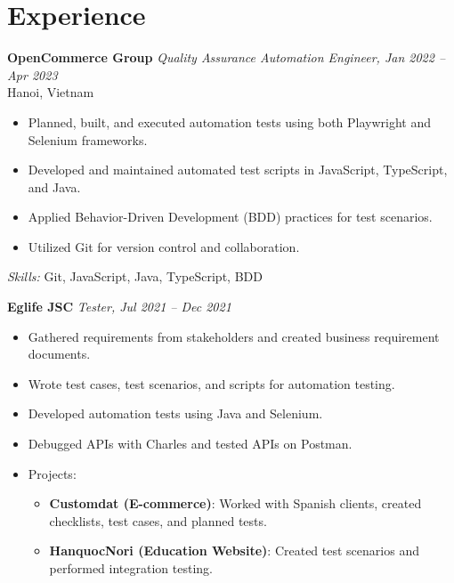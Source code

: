 \documentclass[11pt,a4paper]{article}
\begin{document}
    \section*{Experience}

    \textbf{OpenCommerce Group} \hfill \textit{Quality Assurance Automation Engineer, Jan 2022 -- Apr 2023} \\
    Hanoi, Vietnam
    \begin{itemize}[leftmargin=1.5em]
        \item Planned, built, and executed automation tests using both Playwright and Selenium frameworks.
        \item Developed and maintained automated test scripts in JavaScript, TypeScript, and Java.
        \item Applied Behavior-Driven Development (BDD) practices for test scenarios.
        \item Utilized Git for version control and collaboration.
    \end{itemize}
    \textit{Skills:} Git, JavaScript, Java, TypeScript, BDD

    \vspace{1.5em}

    \textbf{Eglife JSC} \hfill \textit{Tester, Jul 2021 -- Dec 2021}
    \begin{itemize}[leftmargin=1.5em]
        \item Gathered requirements from stakeholders and created business requirement documents.
        \item Wrote test cases, test scenarios, and scripts for automation testing.
        \item Developed automation tests using Java and Selenium.
        \item Debugged APIs with Charles and tested APIs on Postman.
        \item Projects:
        \begin{itemize}
            \item \textbf{Customdat (E-commerce)}: Worked with Spanish clients, created checklists, test cases, and planned tests.
            \item \textbf{HanquocNori (Education Website)}: Created test scenarios and performed integration testing.
        \end{itemize}
    \end{itemize}

    \vspace{1.5em}
\end{document}
